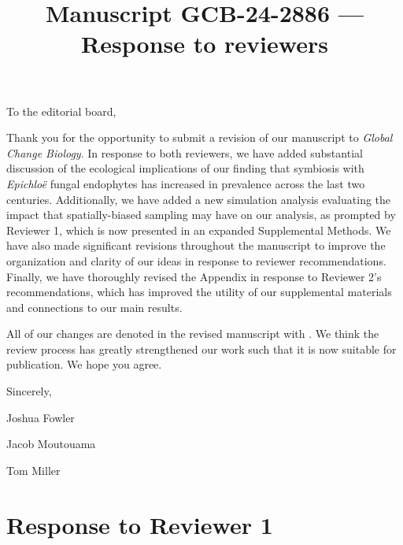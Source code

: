 \documentclass[12pt]{article}
\newcommand{\revise}[1]{{\color{Mahogany}{#1}}}
\begin{document}
\title{Manuscript GCB-24-2886 --- Response to reviewers}

\maketitle
\noindent To the editorial board,


Thank you for the opportunity to submit a revision of our manuscript to \emph{Global Change Biology}. 
In response to both reviewers, we have added substantial discussion of the ecological implications of our finding that symbiosis with \emph{Epichloë} fungal endophytes has increased in prevalence across the last two centuries.
Additionally, we have added a new simulation analysis evaluating the impact that spatially-biased sampling may have on our analysis, as prompted by Reviewer 1, which is now presented in an expanded Supplemental Methods.
We have also made significant revisions throughout the manuscript to improve the organization and clarity of our ideas in response to reviewer recommendations.   
Finally, we have thoroughly revised the Appendix in response to Reviewer 2's recommendations, which has improved the utility of our supplemental materials and connections to our main results. 

All of our changes are denoted in the revised manuscript with \revise{Mahogany font}. 
We think the review process has greatly strengthened our work such that it is now suitable for publication.
We hope you agree. 

\vspace{2em}
Sincerely,

Joshua Fowler

Jacob Moutouama

Tom Miller



\newpage

\section{Response to Reviewer 1}
\vspace{-2em}
\end{document}
